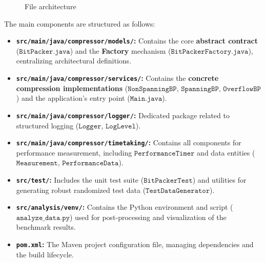 \documentclass[11pt, a4paper]{article}
\begin{document}
	
	\begin{figure}[h]
		\centering
		\begin{minipage}{\textwidth}
			\begin{flushleft}
			\end{flushleft}
		\end{minipage}
		\caption{File architecture}
		\label{fig:dirtree}
	\end{figure}
	
	The main components are structured as follows:
	\begin{itemize}
		\item \textbf{\texttt{src/main/java/compressor/models/}:} Contains the core \textbf{abstract contract} ($\texttt{BitPacker.java}$) and the \textbf{Factory} mechanism ($\texttt{BitPackerFactory.java}$), centralizing architectural definitions.
		
		\item \textbf{\texttt{src/main/java/compressor/services/}:} Contains the \textbf{concrete compression implementations} ($\texttt{NonSpanningBP}$, $\texttt{SpanningBP}$, $\texttt{OverflowBP}$) and the application's entry point ($\texttt{Main.java}$).
		
		\item \textbf{\texttt{src/main/java/compressor/logger/}:} Dedicated package related to structured logging ($\texttt{Logger}$, $\texttt{LogLevel}$).
		
		\item \textbf{\texttt{src/main/java/compressor/timetaking/}:} Contains all components for performance measurement, including $\texttt{PerformanceTimer}$ and data entities ($\texttt{Measurement}$, $\texttt{PerformanceData}$).
		
		\item \textbf{\texttt{src/test/}:} Includes the unit test suite ($\texttt{BitPackerTest}$) and utilities for generating robust randomized test data ($\texttt{TestDataGenerator}$).
		
		\item \textbf{\texttt{src/analysis/venv/}:} Contains the Python environment and script ($\texttt{analyze\_data.py}$) used for post-processing and visualization of the benchmark results.
		
		\item \textbf{\texttt{pom.xml}:} The Maven project configuration file, managing dependencies and the build lifecycle.
	\end{itemize}
	
\end{document}

